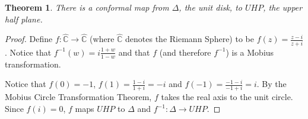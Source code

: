 \documentclass[12pt]{article}
\newtheorem{thm}{Theorem}
\begin{document}
\begin{thm} There is a conformal map from $\Delta$, the unit disk, to $UHP$, the upper half plane. \end{thm}

\begin{proof} Define $f \colon \hat{{\mathbb C}} \to \hat{{\mathbb C}}$ (where $\hat{{\mathbb C}}$ denotes the Riemann Sphere) to be $f(z) = \displaystyle{\frac{z-i}{z+i}}$. Notice that $f^{-1}(w)= \displaystyle{i \frac{1+w}{1-w}}$ and that $f$ (and therefore $f^{-1}$) is a Mobius transformation. 

Notice that $f(0)=-1$, $f(1)=\displaystyle{\frac{1-i}{1+i}} = -i$ and $f(-1) = \displaystyle{\frac{-1-i}{-1+i}} = i$. By the Mobius Circle Transformation Theorem, $f$ takes the real axis to the unit circle. Since $f(i)=0$, $f$ maps $UHP$ to $\Delta$ and $f^{-1}:\Delta \to UHP$. \end{proof}
\end{document}
